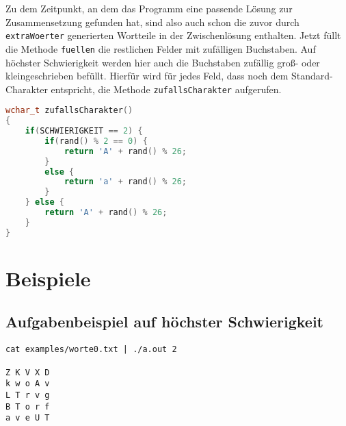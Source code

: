 \documentclass[a4paper,10pt,ngerman]{scrartcl}
\begin{document}
Zu dem Zeitpunkt, an dem das Programm eine passende Lösung zur Zusammensetzung gefunden hat, sind also auch schon die zuvor durch \lstinline{extraWoerter} generierten Wortteile in der Zwischenlösung enthalten.
Jetzt füllt die Methode \lstinline{fuellen} die restlichen Felder mit zufälligen Buchstaben. 
Auf höchster Schwierigkeit werden hier auch die Buchstaben zufällig groß- oder kleingeschrieben befüllt.
Hierfür wird für jedes Feld, dass noch dem Standard-Charakter entspricht, die Methode \lstinline{zufallsCharakter} aufgerufen.

\begin{lstlisting}[language=C++]
wchar_t zufallsCharakter()
{
    if(SCHWIERIGKEIT == 2) {
        if(rand() % 2 == 0) {
            return 'A' + rand() % 26;
        }
        else {
            return 'a' + rand() % 26;
        }
    } else {
        return 'A' + rand() % 26;
    }
}
\end{lstlisting}

\section{Beispiele}
\subsection{Aufgabenbeispiel auf höchster Schwierigkeit}
\begin{lstlisting}
cat examples/worte0.txt | ./a.out 2

Z K V X D
k w o A v
L T r v g
B T o r f
a v e U T
\end{lstlisting}
\end{document}
